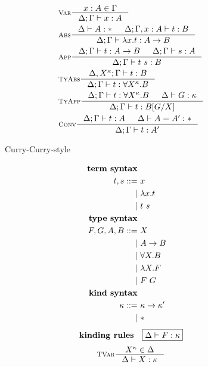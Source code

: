 \begin{figure}
\begin{singlespace}
\begin{minipage}{.46\textwidth}
\begin{align*}
& \inference[\sc Var]{x:A \in \Gamma}{\Delta;\Gamma |- x:A} \\
& \inference[\sc Abs]{\Delta |- A:* & \Delta;\Gamma,x:A |- t : B}
                     {\Delta;\Gamma |- \l x   .t : A -> B} \\
& \inference[\sc App]{\Delta;\Gamma |- t : A -> B & \Delta;\Gamma |- s : A}
                     {\Delta;\Gamma |- t~s : B} \\
& \inference[\sc TyAbs]{\Delta,X^\kappa;\Gamma |- t : B}
                       {\Delta;\Gamma |- t : \forall X^\kappa.B} \\
& \inference[\sc TyApp]{\Delta;\Gamma |- t : \forall X^\kappa.B & \Delta |- G:\kappa}
                       {\Delta;\Gamma |- t : B[G/X]} \\
& \inference[\sc Conv]{\Delta;\Gamma |- t : A & \Delta |- A = A' : *}
                      {\Delta;\Gamma |- t : A'}
\end{align*}
\end{minipage}
\begin{minipage}{.46\textwidth}
        \begin{center}Curry-Curry-style\end{center}
\def\baselinestretch{0}
\small
\begin{align*}
\textbf{term syntax} \\
t,s ::= &~ x           \\
      | &~ \lambda x    . t \\
      | &~ t ~ s       \\
\textbf{type syntax} \\
F,G,A,B ::= &~ X                  \\
          | &~ A -> B             \\   
          | &~ \forall X.B \\
          | &~ \lambda X.F      \\
          | &~ F ~ G              \\
\textbf{kind syntax} \\
\kappa ::= &~ \kappa -> \kappa'  \\
         | &~ *                  \\
\end{align*}
\[ \textbf{kinding rules} \quad \framebox{$ \Delta |- F:\kappa $} \]\vspace*{-1em}
\begin{align*}
& \inference[\sc TVar]{X^\kappa \in \Delta}{\Delta |- X:\kappa} \\

\end{align*}
\end{minipage}
\end{singlespace}
\end{figure}
